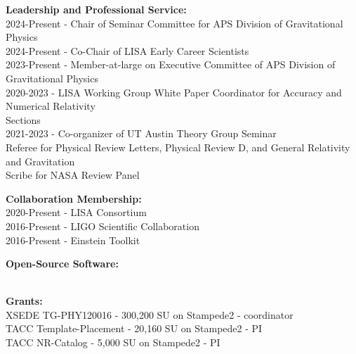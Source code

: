 \documentclass[11pt]{article}
\begin{document}
\begin{flushleft}
  \textbf{Leadership and Professional Service: }\\
  2024-Present - Chair of Seminar Committee for APS Division of Gravitational Physics\\
  2024-Present - Co-Chair of LISA Early Career Scientists\\
  2023-Present - Member-at-large on Executive Committee of APS Division of Gravitational Physics\\
  2020-2023 - LISA Working Group White Paper Coordinator for Accuracy and Numerical Relativity\\ \hspace{58px}Sections \\
  2021-2023 - Co-organizer of UT Austin Theory Group Seminar\\
  Referee for Physical Review Letters, Physical Review D,  and General Relativity and Gravitation\\
  Scribe for NASA Review Panel\\
  
  \vspace{8px}  
  
  \textbf{Collaboration Membership: }\\
  2020-Present - LISA Consortium\\
  2016-Present - LIGO Scientific Collaboration\\
  2016-Present - Einstein Toolkit\\
  
  \vspace{8px}
  
  \textbf{Open-Source Software:}\\
  \\
  
  \vspace{8px}

  \textbf{Grants:}\\
	XSEDE TG-PHY120016 - 300,200 SU on Stampede2 - coordinator\\
	TACC Template-Placement - 20,160 SU on Stampede2 - PI\\
	TACC NR-Catalog - 5,000 SU on Stampede2 - PI\\
	
  \vspace{8px}


\end{flushleft}
\end{document}
